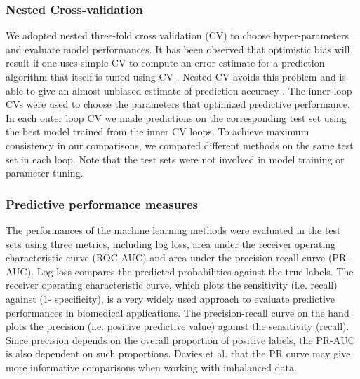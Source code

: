    \subsubsection{Nested Cross-validation}
      We adopted nested three-fold cross validation (CV) to choose hyper-parameters and evaluate model performances. It has been observed that optimistic bias will result if one uses simple CV to compute an error estimate for a prediction algorithm that itself is tuned using CV \cite{varma2006bias}. Nested CV avoids this problem and is able to give an almost unbiased estimate of prediction accuracy \cite{varma2006bias}. The inner loop CVs were used to choose the parameters that optimized predictive performance. In each outer loop CV we made predictions on the corresponding test set using the best model trained from the inner CV loops. To achieve maximum consistency in our comparisons, we compared different methods on the same test set in each loop. Note that the test sets were not involved in model training or parameter tuning.

    \subsubsection{Predictive performance measures}
      The performances of the machine learning methods were evaluated in the test sets using three metrics, including log loss, area under the receiver operating characteristic curve (ROC-AUC) and area under the precision recall curve (PR-AUC). Log loss compares the predicted probabilities against the true labels. The receiver operating characteristic curve, which plots the sensitivity (i.e. recall) against (1- specificity), is a very widely used approach to evaluate predictive performances in biomedical applications. The precision-recall curve on the hand plots the precision (i.e. positive predictive value) against the sensitivity (recall). Since precision depends on the overall proportion of positive labels, the PR-AUC is also dependent on such proportions. Davies et al. \cite{davis2006relationship}  that the PR curve may give more informative comparisons when working with imbalanced data.

